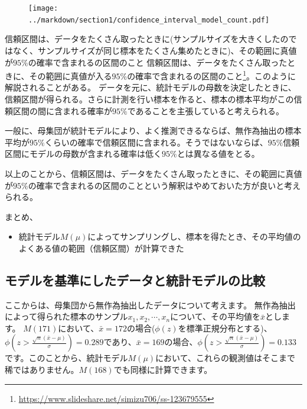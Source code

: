 \begin{figure}
\begin{center}
    \texttt{[image: ../markdown/section1/confidence\_interval\_model\_count.pdf]}
  \end{center}
\end{figure}


\begin{SMbox}{信頼区間は、データをたくさん取ったときに(サンプルサイズを大きくしたのではなく、サンプルサイズが同じ標本をたくさん集めたときに)、その範囲に真値が$95\%$の確率で含まれるの区間のこと}
信頼区間は、データをたくさん取ったときに、その範囲に真値が入る$95\%$の確率で含まれるの区間のこと\footnote{\url{https://www.slideshare.net/simizu706/ss-123679555}}。このように解説されることがある。
データを元に、統計モデルの母数を決定したときに、信頼区間が得られる。さらに計測を行い標本を作ると、標本の標本平均がこの信頼区間の間に含まれる確率が$95\%$であることを主張していると考えられる。

一般に、母集団が統計モデルにより、よく推測できるならば、無作為抽出の標本平均が$95\%$くらいの確率で信頼区間に含まれる。そうではないならば、$95\%$信頼区間にモデルの母数が含まれる確率は低く$95\%$とは異なる値をとる。

以上のことから、信頼区間は、データをたくさん取ったときに、その範囲に真値が$95\%$の確率で含まれるの区間のことという解釈はやめておいた方が良いと考えられる。
\end{SMbox}


\begin{framed}
まとめ、
\begin{itemize}
    \item 統計モデル$M(\mu)$によってサンプリングし、標本を得たとき、その平均値のよくある値の範囲（信頼区間）が計算できた
\end{itemize}
\end{framed}

\subsection{モデルを基準にしたデータと統計モデルの比較}
ここからは、母集団から無作為抽出したデータについて考えます。
無作為抽出によって得られた標本のサンプル$x_1,x_2,\cdots,x_n$について、その平均値を$\bar{x}$とします。
$M(171)$において、$\bar{x}=172$の場合($\phi(z)$を標準正規分布とする)、$\phi(z>\frac{\sqrt{n}(\bar{x}-\mu)}{\sigma}) = 0.289$であり、$\bar{x}=169$の場合、$\phi(z>\frac{\sqrt{n}(\bar{x}-\mu)}{\sigma}) = 0.133$です。このことから、統計モデル$M(\mu)$において、これらの観測値はそこまで稀ではありません。$M(168)$でも同様に計算できます。

